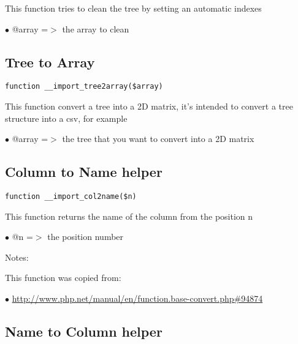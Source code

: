 \documentclass[a4paper]{book}
\def\htmladdnormallink#1#2{\href{#2}{#1}}
\begin{document}
This function tries to clean the tree by setting an automatic indexes

\begin{compactitem}
\item[\color{myblue}$\bullet$] @array =$>$ the array to clean
\end{compactitem}

\hypertarget{toc174}{}
\subsection{Tree to Array}

\begin{lstlisting}
function __import_tree2array($array)
\end{lstlisting}

This function convert a tree into a 2D matrix, it's intended to convert
a tree structure into a csv, for example

\begin{compactitem}
\item[\color{myblue}$\bullet$] @array =$>$ the tree that you want to convert into a 2D matrix
\end{compactitem}

\hypertarget{toc175}{}
\subsection{Column to Name helper}

\begin{lstlisting}
function __import_col2name($n)
\end{lstlisting}

This function returns the name of the column from the position n

\begin{compactitem}
\item[\color{myblue}$\bullet$] @n =$>$ the position number
\end{compactitem}

Notes:

This function was copied from:

\begin{compactitem}
\item[\color{myblue}$\bullet$] \htmladdnormallink{http://www.php.net/manual/en/function.base-convert.php\#94874}{http://www.php.net/manual/en/function.base-convert.php\#94874}
\end{compactitem}

\hypertarget{toc176}{}
\subsection{Name to Column helper}
\end{document}
